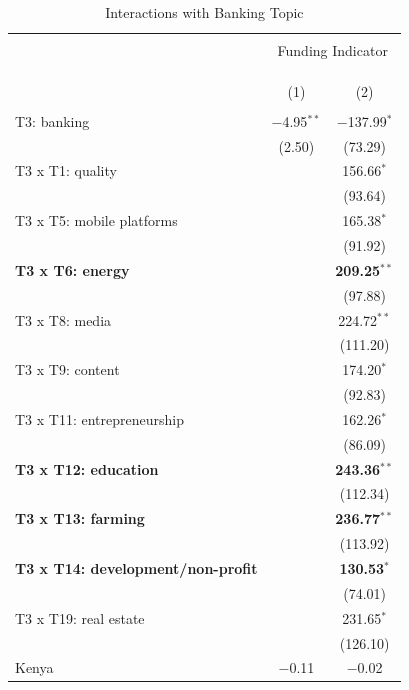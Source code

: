 \documentclass[12pt]{article}
\begin{document}
\begin{table}[!htbp] \centering 
  \caption{Interactions with Banking Topic} 
  \label{} 
\scriptsize 
\begin{tabular}{@{\extracolsep{5pt}}lcc} 
\\[-1.8ex]\hline 
\hline \\[-1.8ex] 
 & \multicolumn{2}{c}{Funding Indicator} \\ 
\cline{2-3} 
\\[-1.8ex] & \multicolumn{2}{c}{} \\ 
\\[-1.8ex] & (1) & (2)\\ 
\hline \\[-1.8ex] 
  T3: banking & $-$4.95$^{**}$ & $-$137.99$^{*}$ \\ 
  & (2.50) & (73.29) \\ 
  T3 x T1: quality &  & 156.66$^{*}$ \\ 
  &  & (93.64) \\ 
  T3 x T5: mobile platforms &  & 165.38$^{*}$ \\ 
  &  & (91.92) \\ 
  \textbf{T3 x T6: energy} &  & \textbf{209.25}$^{**}$ \\ 
  &  & (97.88) \\ 
  T3 x T8: media &  & 224.72$^{**}$ \\ 
  &  & (111.20) \\ 
  T3 x T9: content &  & 174.20$^{*}$ \\ 
  &  & (92.83) \\ 
  T3 x T11: entrepreneurship &  & 162.26$^{*}$ \\ 
  &  & (86.09) \\ 
  \textbf{T3 x T12: education} &  & \textbf{243.36}$^{**}$ \\ 
  &  & (112.34) \\ 
  \textbf{T3 x T13: farming} &  & \textbf{236.77}$^{**}$ \\ 
  &  & (113.92) \\ 
  \textbf{T3 x T14: development/non-profit} &  & \textbf{130.53}$^{*}$ \\ 
  &  & (74.01) \\ 
  T3 x T19: real estate &  & 231.65$^{*}$ \\ 
  &  & (126.10) \\ 
  Kenya & $-$0.11 & $-$0.02 \\ 

\end{tabular}
\end{table}
\end{document}

